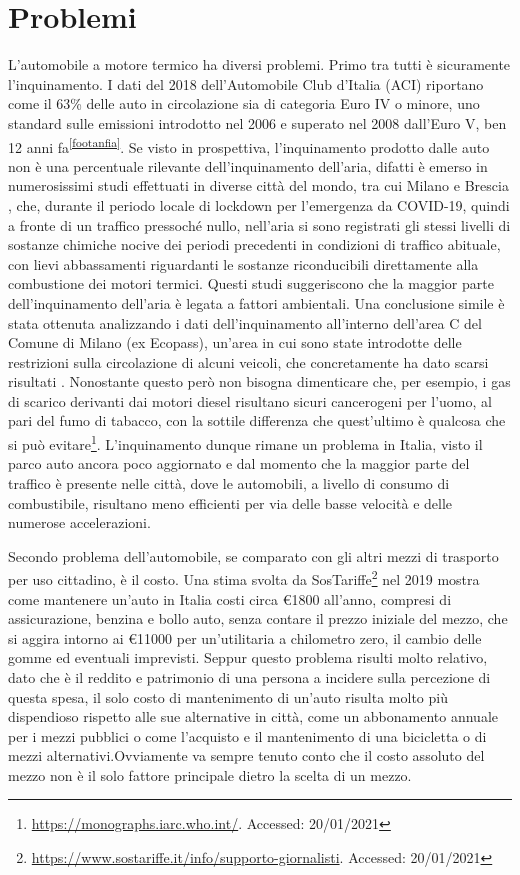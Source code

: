 \section{Problemi}

L'automobile a motore termico ha diversi problemi. Primo tra tutti è sicuramente l'inquinamento. I dati del 2018 dell'Automobile Club d'Italia (ACI) riportano come il 63\% delle auto in circolazione sia di categoria Euro IV o minore, uno standard sulle emissioni introdotto nel 2006 e superato nel 2008 dall'Euro V, ben 12 anni fa\textsuperscript{\ref{footanfia}}. Se visto in prospettiva, l'inquinamento prodotto dalle auto non è una percentuale rilevante dell'inquinamento dell'aria, difatti è emerso in numerosissimi studi effettuati in diverse città del mondo, tra cui Milano e Brescia \cite{collivignarelli2021analysis}\cite{cameletti2020effect}, che, durante il periodo locale di lockdown per l'emergenza da COVID-19,  quindi a fronte di un traffico pressoché nullo, nell'aria si sono registrati gli stessi livelli di sostanze chimiche nocive dei periodi precedenti in condizioni di traffico abituale, con lievi abbassamenti riguardanti le sostanze riconducibili direttamente alla combustione dei motori termici. Questi studi suggeriscono che la maggior parte dell'inquinamento dell'aria è legata a fattori ambientali. Una conclusione simile è stata ottenuta analizzando i dati dell'inquinamento all'interno dell'area C del Comune di Milano (ex Ecopass), un'area in cui sono state introdotte delle restrizioni sulla circolazione di alcuni veicoli, che concretamente ha dato scarsi risultati \cite{trentini2014lombardy}. Nonostante questo però non bisogna dimenticare che, per esempio, i gas di scarico derivanti dai motori diesel risultano sicuri cancerogeni per l'uomo, al pari del fumo di tabacco, con la sottile differenza che quest'ultimo è qualcosa che si può evitare\footnote{\url{https://monographs.iarc.who.int/}. Accessed: 20/01/2021}. L'inquinamento dunque rimane un problema in Italia, visto il parco auto ancora poco aggiornato e dal momento che la maggior parte del traffico è presente nelle città, dove le automobili, a livello di consumo di combustibile, risultano meno efficienti per via delle basse velocità e delle numerose accelerazioni.

Secondo problema dell'automobile, se comparato con gli altri mezzi di trasporto per uso cittadino, è il costo. Una stima svolta da SosTariffe\footnote{\url{https://www.sostariffe.it/info/supporto-giornalisti}. Accessed: 20/01/2021} nel 2019 mostra come mantenere un'auto in Italia costi circa €1800 all'anno, compresi di assicurazione, benzina e bollo auto, senza contare il prezzo iniziale del mezzo, che si aggira intorno ai €11000 per un'utilitaria a chilometro zero, il cambio delle gomme ed eventuali imprevisti. Seppur questo problema risulti molto relativo, dato che è il reddito e patrimonio di una persona a incidere sulla percezione di questa spesa, il solo costo di mantenimento di un'auto risulta molto più dispendioso rispetto alle sue alternative in città, come un abbonamento annuale per i mezzi pubblici o come l'acquisto e il mantenimento di una bicicletta o di mezzi alternativi.Ovviamente va sempre tenuto conto che il costo assoluto del mezzo non è il solo fattore principale dietro la scelta di un mezzo.

